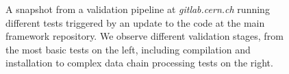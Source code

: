 
\begin{figure}[htb!]
  \centering
	\caption{A snapshot from a validation pipeline at \emph{gitlab.cern.ch} running different tests triggered by an update to the code at the main framework repository. We observe different validation stages, from the most basic tests on the left, including compilation and installation to complex data chain processing tests on the right.}\label{fig:pipelines}
\end{figure}
